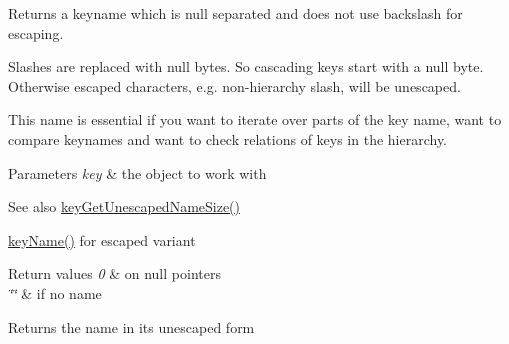 Returns a keyname which is null separated and does not use backslash for escaping. 

Slashes are replaced with null bytes. So cascading keys start with a null byte. Otherwise escaped characters, e.\+g. non-\/hierarchy slash, will be unescaped.

This name is essential if you want to iterate over parts of the key name, want to compare keynames and want to check relations of keys in the hierarchy.


\begin{DoxyParams}{Parameters}
{\em key} & the object to work with\\
\hline
\end{DoxyParams}
\begin{DoxySeeAlso}{See also}
\mbox{\hyperlink{group__keyname_ga5e7eff0c77678420199d0d2e8729152b}{key\+Get\+Unescaped\+Name\+Size()}} 

\mbox{\hyperlink{group__keyname_ga8e805c726a60da921d3736cda7813513}{key\+Name()}} for escaped variant 
\end{DoxySeeAlso}

\begin{DoxyRetVals}{Return values}
{\em 0} & on null pointers \\
\hline
{\em \char`\"{}\char`\"{}} & if no name \\
\hline
\end{DoxyRetVals}
\begin{DoxyReturn}{Returns}
the name in its unescaped form 
\end{DoxyReturn}
